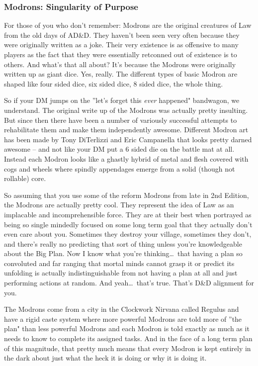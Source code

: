\subsubsection{Modrons: Singularity of Purpose}

For those of you who don't remember: Modrons are the original creatures of Law from the old days of AD\&D. They haven't been seen very often because they were originally written as a joke. Their very existence is as offensive to many players as the fact that they were essentially retconned out of existence is to others. And what's that all about? It's because the Modrons were originally written up as giant dice. Yes, really. The different types of basic Modron are shaped like four sided dice, six sided dice, 8 sided dice, the whole thing.

So if your DM jumps on the ''let's forget this \textit{ever} happened" bandwagon, we understand. The original write up of the Modrons was actually pretty insulting. But since then there have been a number of variously successful attempts to rehabilitate them and make them independently awesome. Different Modron art has been made by Tony DiTerlizzi and Eric Campanella that looks pretty darned awesome -- and not like your DM put a 6 sided die on the battle mat at all. Instead each Modron looks like a ghastly hybrid of metal and flesh covered with cogs and wheels where spindly appendages emerge from a solid (though not rollable) core.

So assuming that you use some of the reform Modrons from late in 2nd Edition, the Modrons are actually pretty cool. They represent the idea of Law as an implacable and incomprehensible force. They are at their best when portrayed as being so single mindedly focused on some long term goal that they actually don't even care about you. Sometimes they destroy your village, sometimes they don't, and there's really no predicting that sort of thing unless you're knowledgeable about the Big Plan. Now I know what you're thinking\ldots\ that having a plan so convoluted and far ranging that mortal minds cannot grasp it or predict its unfolding is actually indistinguishable from not having a plan at all and just performing actions at random. And yeah\ldots\ that's true. That's D\&D alignment for you.

The Modrons come from a city in the Clockwork Nirvana called Regulus and have a rigid caste system where more powerful Modrons are told more of ''the plan" than less powerful Modrons and each Modron is told exactly as much as it needs to know to complete its assigned tasks. And in the face of a long term plan of this magnitude, that pretty much means that every Modron is kept entirely in the dark about just what the heck it is doing or why it is doing it.
